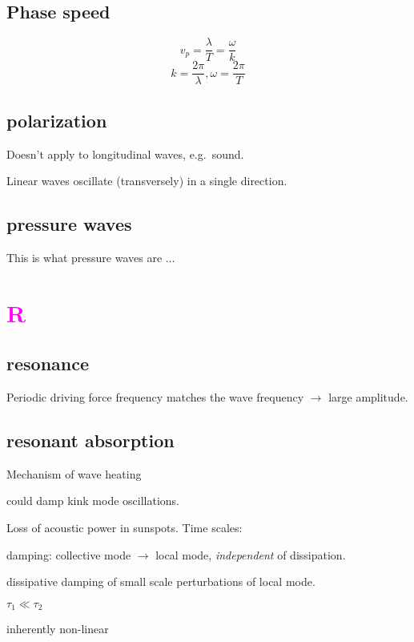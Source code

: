 \documentclass[12pt]{article}
\begin{document}
\subsection*{Phase speed}
$$ v_p = \frac{\lambda}{T} = \frac{\omega}{k} $$
$$ k = \frac{2\pi}{\lambda}, \omega = \frac{2\pi}{T} $$

\subsection*{polarization}
\begin{itemize*}
    \item Doesn't apply to longitudinal waves, e.g.\ sound.
    \item Linear waves oscillate (transversely) in a single direction.
\end{itemize*}

\subsection*{pressure waves}
This is what pressure waves are $\ldots$

\section*{\textcolor{magenta}{R}}

\subsection*{resonance}
Periodic driving force frequency matches the wave frequency
$\rightarrow$ large amplitude.

\subsection*{resonant absorption}
\begin{itemize*}
    \item Mechanism of wave heating
    \item could damp kink mode oscillations.
    \item Loss of acoustic power in sunspots. Time scales:
        \begin{enumerate*}
            \item damping: collective mode $\rightarrow$ local mode,
                \emph{independent} of dissipation.
            \item dissipative damping of small scale perturbations of local
                mode.
        \end{enumerate*}
        $\tau_1 \ll \tau_2$
    \item inherently non-linear
\end{itemize*}
\end{document}
